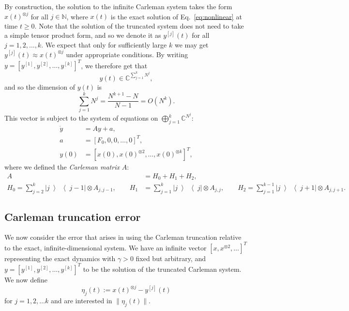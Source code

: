 \documentclass[superscriptaddress,onecolumn,nofootinbib,longbibliography,a4paper,accepted=2026-09-29]{quantumarticle}
\theoremstyle{plain}
\theoremstyle{definition}
\numberwithin{thm}{section}
\numberwithin{assumption}{section}
\numberwithin{lemma}{section}
\numberwithin{prop}{section}
\numberwithin{cor}{section}
\numberwithin{definition}{section}
\numberwithin{rmk}{section}
\numberwithin{equation}{section}
\newcommand{\ketbra}[2]   {\left|#1\middle\rangle\!\middle\langle#2\right|}
\newcommand{\ot}{\otimes}
\begin{document}
By construction, the solution to the infinite Carleman system takes the form $x(t)^{\otimes j}$ for all $j \in \mathbb{N}$, where $x(t)$ is the exact solution of Eq.~\eqref{eq:nonlinear} at time $t \ge 0$. Note that the solution of the truncated system does not need to take a simple tensor product form, and so we denote it as $y^{[j]}(t)$ for all $j=1,2,\dots, k$. We expect that only for sufficiently large $k$ we may get $y^{[j]}(t) \approx x(t)^{\otimes j}$ under appropriate conditions. By writing $y = [y^{[1]}, y^{[2]}, \dots, y^{[k]}]^T$, we therefore get that 
\begin{equation}
    y(t) \in \mathbb{C}^{\sum_{j=1}^{k} N^j},
\end{equation}
and so the dimension of $y(t)$ is
\begin{equation}
    \sum_{j=1}^{k} N^j = \frac{N^{k+1} - N}{N-1} = O(N^{k}).
\end{equation}
This vector is subject to the system of equations on $\bigoplus_{j=1}^{k} \mathbb{C}^{N^j}$:
\begin{equation}
\begin{aligned}
\label{eq:CarlemanODE}
    \dot{y} &= A y + a,  \\
    a &= [F_0, 0, 0, \dots , 0]^T,  \\
    y(0) &= [ x(0),x(0)^{\otimes 2}, \dots, x(0)^{\otimes k} ]^T,
\end{aligned}
\end{equation}
where we defined the \emph{Carleman matrix} $A$:
\begin{equation}
    \begin{aligned}
        A &= H_0 + H_1 +H_2,  \\
        H_0 = \sum_{j=2}^{k} \ketbra{j}{j-1}\otimes A_{j,j-1},
         \qquad
        H_1 &= \sum_{j=1}^{k} \ketbra{j}{j}\otimes A_{j,j},
         \qquad
        H_2 = \sum_{j=1}^{k-1} \ketbra{j}{j+1} \otimes A_{j,j+1}.
    \end{aligned}
    \label{eq:CarlemannMatrix2}
\end{equation}




\subsection{Carleman truncation error}

We now consider the error that arises in using the Carleman truncation relative to the exact, infinite-dimensional system. 
We have an infinite vector $[x,x^{\ot 2},\dots]^T$ representing the exact dynamics with $\gamma>0$ fixed but arbitrary, and $y = [y^{[1]}, y^{[2]}, \dots, y^{[k]}]^T$ to be the solution of the truncated Carleman system. We now define
\begin{equation}
\label{eq:errorvectorcomponents}
    \eta_j(t) := x(t)^{\ot j} - y^{[j]}(t)
\end{equation}
for $j=1,2, \dots k$ and are interested in $\|\eta_j(t)\|$.
\end{document}
